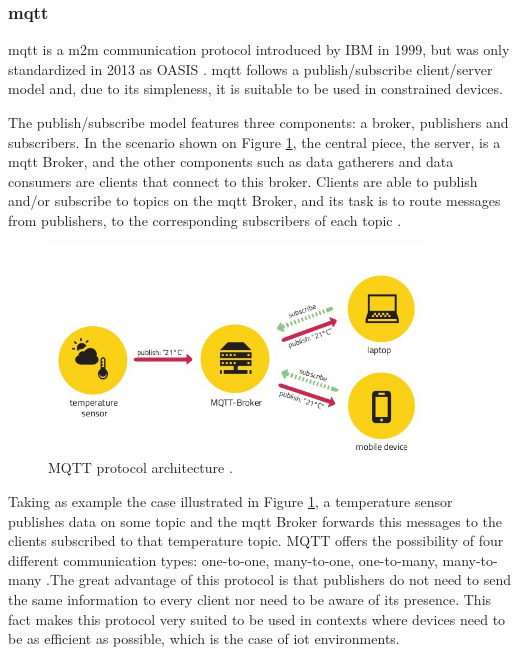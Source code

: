 \subsubsection{\acf{mqtt}}

\acf{mqtt} is a \ac{m2m} communication protocol introduced by IBM in 1999, but was only standardized in 2013 as OASIS \cite{Al-fuqaha2015}. \ac{mqtt} follows a publish/subscribe client/server model and, due to its simpleness, it is suitable to be used in constrained devices.

The publish/subscribe model features three components: a broker, publishers and subscribers. In the scenario shown on Figure \ref{fig:mqtt}, the central piece, the server, is a \ac{mqtt} Broker, and the other components such as data gatherers and data consumers are clients that connect to this broker. Clients are able to publish and/or subscribe to topics on the \ac{mqtt} Broker, and its task is to route messages from publishers, to the corresponding subscribers of each topic \cite{Al-fuqaha2015}. 

\begin{figure}[H]
	\centering
	\includegraphics[width=0.9\textwidth]{figures/mqtt.jpg}
	\caption{MQTT protocol architecture \cite{Turan}.}
	\label{fig:mqtt}
\end{figure}

Taking as example the case illustrated in Figure \ref{fig:mqtt}, a temperature sensor publishes data on some topic and the \ac{mqtt} Broker forwards this messages to the clients subscribed to that temperature topic. MQTT offers the possibility of four different communication types: one-to-one,  many-to-one, one-to-many, many-to-many \cite{Chen2016}.The great advantage of this protocol is that publishers do not need to send the same information to every client nor need to be aware of its presence. This fact makes this protocol very suited to be used in contexts where devices need to be as efficient as possible, which is the case of \ac{iot} environments. 

